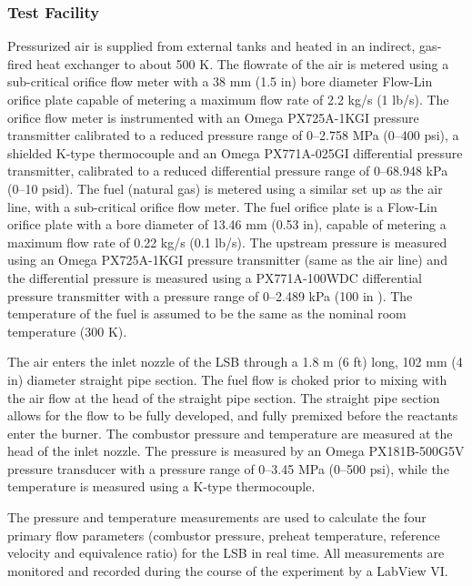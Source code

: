 \subsubsection{Test Facility}
\label{subsubsec:configuration-a-test-facility}



Pressurized air is supplied from external tanks and heated in an indirect, gas-fired heat exchanger to about 500 K.
The flowrate of the air is metered using a sub-critical orifice flow meter with a 38 mm (1.5 in) bore diameter Flow-Lin orifice plate capable of metering a maximum flow rate of 2.2 kg/s (1 lb/s).
The orifice flow meter is instrumented with an Omega PX725A-1KGI pressure transmitter calibrated to a reduced pressure range of 0--2.758 MPa (0--400 psi), a shielded K-type thermocouple and an Omega PX771A-025GI differential pressure transmitter, calibrated to a reduced differential pressure range of 0--68.948 kPa (0--10 psid).
The fuel (natural gas) is metered using a similar set up as the air line, with a sub-critical orifice flow meter.
The fuel orifice plate is a Flow-Lin orifice plate with a bore diameter of 13.46 mm (0.53 in), capable of metering a maximum flow rate of 0.22 kg/s (0.1 lb/s).
The upstream pressure is measured using an Omega PX725A-1KGI pressure transmitter (same as the air line) and the differential pressure is measured using a PX771A-100WDC differential pressure transmitter with a pressure range of 0--2.489 kPa (100 in ).
The temperature of the fuel is assumed to be the same as the nominal room temperature (300 K).

The air enters the inlet nozzle of the LSB through a 1.8 m (6 ft) long, 102 mm (4 in) diameter straight pipe section.
The fuel flow is choked prior to mixing with the air flow at the head of the straight pipe section.
The straight pipe section allows for the flow to be fully developed, and fully premixed before the reactants enter the burner.
The combustor pressure and temperature are measured at the head of the inlet nozzle.
The pressure is measured by an Omega PX181B-500G5V pressure transducer with a pressure range of 0--3.45 MPa (0--500 psi), while the temperature is measured using a K-type thermocouple.

The pressure and temperature measurements are used to calculate the four primary flow parameters (combustor pressure, preheat temperature, reference velocity and equivalence ratio) for the LSB in real time.
All measurements are monitored and recorded during the course of the experiment by a LabView VI.

